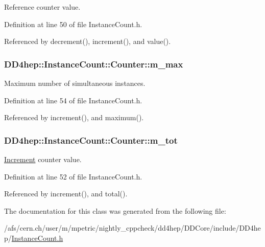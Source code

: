 Reference counter value. 

Definition at line 50 of file InstanceCount.h.

Referenced by decrement(), increment(), and value().\hypertarget{class_d_d4hep_1_1_instance_count_1_1_counter_a037706f44071d417950579ff8627732b}{
\subsubsection[{m\_\-max}]{ {\bf DD4hep::InstanceCount::Counter::m\_\-max}}}
\label{class_d_d4hep_1_1_instance_count_1_1_counter_a037706f44071d417950579ff8627732b}


Maximum number of simultaneous instances. 

Definition at line 54 of file InstanceCount.h.

Referenced by increment(), and maximum().\hypertarget{class_d_d4hep_1_1_instance_count_1_1_counter_aecd05cbfb249522b056b6e0c7f163c63}{
\subsubsection[{m\_\-tot}]{ {\bf DD4hep::InstanceCount::Counter::m\_\-tot}}}
\label{class_d_d4hep_1_1_instance_count_1_1_counter_aecd05cbfb249522b056b6e0c7f163c63}


\hyperlink{struct_d_d4hep_1_1_increment}{Increment} counter value. 

Definition at line 52 of file InstanceCount.h.

Referenced by increment(), and total().

The documentation for this class was generated from the following file:\begin{DoxyCompactItemize}
\item 
/afs/cern.ch/user/m/mpetric/nightly\_\-cppcheck/dd4hep/DDCore/include/DD4hep/\hyperlink{_instance_count_8h}{InstanceCount.h}\end{DoxyCompactItemize}
